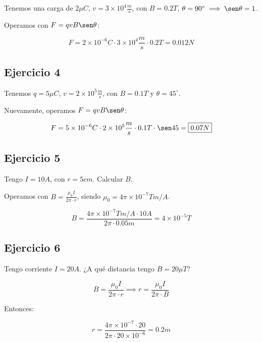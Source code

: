 Tenemos una carga de \(2\mu C\), \(v = 3\times10^{4}\frac{m}{s}\),
con \(B = 0.2T\), \(\theta=90^{\circ}\implies\sen\theta=1\).

Operamos con \(F = qvB\sen\theta\):

\begin{equation*}
    F = 2\times10^{-6} C \cdot 3\times10^{4}\frac{m}{s} \cdot 0.2T = \boxed{0.012N}
\end{equation*}

\subsection{Ejercicio 4}

Tenemos \(q = 5\mu C\), \(v = 2\times10^{5}\frac{m}{s}\),
con \(B=0.1T\) y \(\theta = 45^{\circ}\).

Nuevamente, operamos \(F = qvB\sen\theta\):

\begin{equation*}
    F = 5\times10^{-6}C \cdot 2\times10^{5}\frac{m}{s} \cdot 0.1T \cdot \sen45 = \boxed{0.07 N}
\end{equation*}

\subsection{Ejercicio 5}

Tengo \(I = 10A\), con \(r=5cm\).
Calcular \(B\).

Operamos con \(B = \frac{\mu_0I}{2\pi\cdot r}\),
siendo \(\mu_0 = 4\pi\times10^{-7}Tm/A\).

\begin{equation*}
    B = \frac{4\pi\times10^{-7}Tm/A\cdot10A}{2\pi\cdot 0.05m}=\boxed{4\times10^{-5}T}
\end{equation*}

\subsection{Ejercicio 6}

Tengo corriente \(I = 20A\).
¿A qué distancia tengo \(B = 20 \mu T\)?

\begin{equation*}
    B = \frac{\mu_0I}{2\pi\cdot r} \implies r = \frac{\mu_0I}{2\pi\cdot B}
\end{equation*}

Entonces:

\begin{equation*}
    r = \frac{4\pi\times10^{-7}\cdot20}{2\pi\cdot 20\times10^{-6}} = \boxed{0.2m}
\end{equation*}